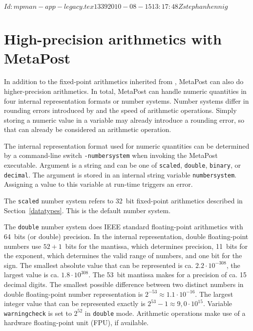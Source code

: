 \svnInfo $Id: mpman-app-legacy.tex 1339 2010-08-15 13:17:48Z stephanhennig $
\section{High-precision arithmetics with MetaPost}
\label{hparith}

In addition to the fixed-point arithmetics inherited from \MF, MetaPost
can also do higher-precision arithmetics.  In total, MetaPost can handle
numeric quantities in four internal representation formats or number
systems.  Number systems differ in rounding errors
introduced by and the speed of arithmetic operations.  Simply storing a
numeric value in a variable may already introduce a rounding error, so
that can already be considered an arithmetic operation.

The internal representation format used for numeric quantities can be
determined by a command-line switch
\texttt{-numbersystem}
when invoking the MetaPost executable.  Argument is a string and can be
one of \texttt{scaled}, \texttt{double}, \texttt{binary}, or
\texttt{decimal}.  The argument is stored in an internal string variable
\texttt{numbersystem}\label{Dnumbersystem}.
Assigning a value to this variable at run-time triggers an error.

The \texttt{scaled} number system refers
to 32~bit fixed-point arithmetics described in Section~\ref{datatypes}.
This is the default number system.

The \texttt{double} number system does
IEEE standard floating-point arithmetics with 64~bits (or double)
precision.  In the internal representation, double floating-point
numbers use $52+1$~bits for the mantissa, which determines precision,
11~bits for the exponent, which determines the valid range of numbers,
and one bit for the sign.  The smallest absolute value that can be
represented is ca. $2.2\cdot10^{-308}$, the largest value is
ca. $1.8\cdot10^{308}$.  The 53~bit mantissa makes for a precision of
ca. 15 decimal digits.  The smallest possible difference between two
distinct numbers in double floating-point number representation is
$2^{-53} \approx 1.1\cdot10^{-16}$.  The largest integer value that can
be represented exactly is $2^{53}-1 \approx 9,0\cdot10^{15}$.  Variable
\texttt{warningcheck} is set
to $2^{52}$ in \texttt{double} mode.  Arithmetic operations make use of
a hardware floating-point unit (FPU), if available.

